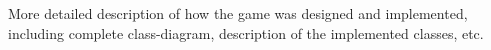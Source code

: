 
More detailed description of how the game was designed and implemented, including complete class-diagram, description of the implemented classes, etc.



